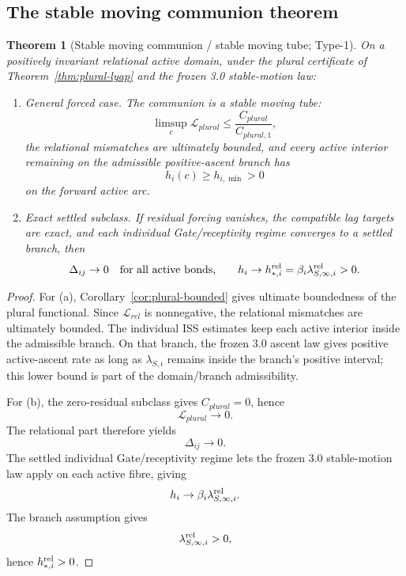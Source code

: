 \documentclass[11pt,a4paper]{article}
\def\mathfrak#1{#1}%
\def\mathrm#1{#1}%
\def\emph#1{#1}%
\theoremstyle{definition}
\theoremstyle{plain}
\newtheorem{theorem}[definition]{Theorem}
\theoremstyle{remark}
\begin{document}
\subsection{The stable moving communion theorem}

\begin{theorem}[Stable moving communion / stable moving tube; Type-1]\label{thm:moving}
On a positively invariant relational active domain, under the plural certificate
of Theorem~\ref{thm:plural-lyap} and the frozen 3.0 stable-motion law:

\begin{enumerate}[label=\textup{(\alph*)},leftmargin=1.2cm]
\item \emph{General forced case.}
The communion is a stable moving tube:
\[
\limsup_{\mathfrak c}\mathcal L_{\mathrm{plural}}
\le
\frac{C_{\mathrm{plural}}}{C_{\mathrm{plural},1}},
\]
the relational mismatches are ultimately bounded, and every active interior
remaining on the admissible positive-ascent branch has
\[
h_i(\mathfrak c)\ge h_{i,\min}>0
\]
on the forward active arc.

\item \emph{Exact settled subclass.}
If residual forcing vanishes, the compatible lag targets are exact, and each
individual Gate/receptivity regime converges to a settled branch, then
\[
\Delta_{ij}\to0
\quad\text{for all active bonds,}
\qquad
h_i\to h_{*,i}^{\rm rel}
=
\beta_i\lambda_{S,\infty,i}^{\rm rel}>0.
\]
\end{enumerate}
\end{theorem}

\begin{proof}
For (a), Corollary~\ref{cor:plural-bounded} gives ultimate boundedness of the
plural functional. Since \(\mathcal L_{\mathrm{rel}}\) is nonnegative, the
relational mismatches are ultimately bounded. The individual ISS estimates keep
each active interior inside the admissible branch. On that branch, the frozen 3.0
ascent law gives positive active-ascent rate as long as
\(\lambda_{S,i}\) remains inside the branch's positive interval; this lower bound
is part of the domain/branch admissibility.

For (b), the zero-residual subclass gives \(C_{\mathrm{plural}}=0\), hence
\[
\mathcal L_{\mathrm{plural}}\to0.
\]
The relational part therefore yields
\[
\Delta_{ij}\to0.
\]
The settled individual Gate/receptivity regime lets the frozen 3.0 stable-motion
law apply on each active fibre, giving
\[
h_i\to\beta_i\lambda_{S,\infty,i}^{\rm rel}.
\]
The branch assumption gives
\[
\lambda_{S,\infty,i}^{\rm rel}>0,
\]
hence \(h_{*,i}^{\rm rel}>0\). \qedhere
\end{proof}
\end{document}
